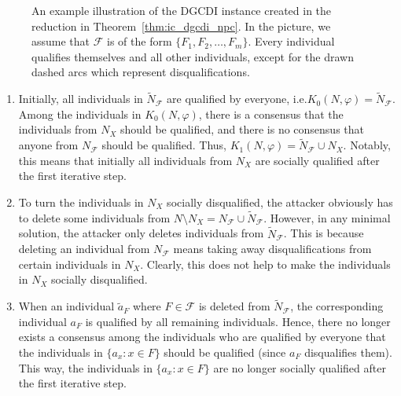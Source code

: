 \documentclass[
    12pt,               %
    a4paper,            %
    bibtotoc,           %
    pointlessnumbers,   %
    ngerman,            %
    titlepage,          %
    leqno,              %
    ]{scrarticle}       %
\newcommand\thmref{Theorem~\ref}
\begin{document}
\begin{Proof}
\begin{figure}[!tbh]
{
}
\caption{An example illustration of the DGCDI instance created in the reduction in \thmref{thm:ic_dgcdi_npc}. In the picture, we assume that $\mathcal{F}$ is of the form $\{ F_1, F_2, \ldots, F_m \}$. Every individual qualifies themselves and all other individuals, except for the drawn dashed arcs which represent disqualifications.}
\label{fig:ic_dgcdi_npc}
\end{figure}



\begin{enumerate}[
    topsep=-4pt,
    leftmargin=*,
    itemindent=4.96em,
    label={\textit{Fact \ref*{thm:ic_dgcdi_npc}.\arabic*}:},
    ref={\ref*{thm:ic_dgcdi_npc}.\arabic*}
]
\item \label{fact:ic_dgcdi_initial_situation}
Initially, all individuals in $\tilde{N}_\mathcal{F}$ are qualified by everyone, i.e.\@ $K_0(N, \varphi) = \tilde{N}_\mathcal{F}$. Among the individuals in $K_0(N, \varphi)$, there is a consensus that the individuals from $N_X$ should be qualified, and there is no consensus that anyone from $N_\mathcal{F}$ should be qualified. Thus, $K_1(N, \varphi) = \tilde{N}_\mathcal{F} \cup N_X$. Notably, this means that initially all individuals from $N_X$ are socially qualified after the first iterative step.

\item \label{fact:ic_dgcdi_no_delete_from_n_f}
To turn the individuals in $N_X$ socially disqualified, the attacker obviously has to delete some individuals from $N \setminus N_X = N_\mathcal{F} \cup \tilde{N}_\mathcal{F}$. However, in any minimal solution, the attacker only deletes individuals from $\tilde{N}_\mathcal{F}$. This is because deleting an individual from $N_\mathcal{F}$ means taking away disqualifications from certain individuals in $N_X$. Clearly, this does not help to make the individuals in $N_X$ socially disqualified.

\item \label{fact:ic_dgcdi_delete_from_n_f}
When an individual $\tilde{a}_F$ where $F \in \mathcal{F}$ is deleted from $\tilde{N}_\mathcal{F}$, the corresponding individual $a_F$ is qualified by all remaining individuals. Hence, there no longer exists a consensus among the individuals who are qualified by everyone that the individuals in $\{ a_x : x \in F \}$ should be qualified (since $a_F$ disqualifies them). This way, the individuals in $\{ a_x : x \in F \}$ are no longer socially qualified after the first iterative step.


\end{enumerate}
\end{Proof}
\end{document}
